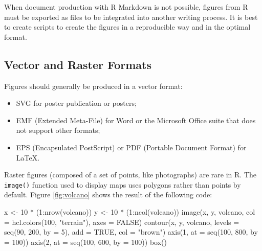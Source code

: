 \documentclass[
  12pt,
  american,
  a4paper,
  extrafontsizes,onecolumn,openright
  ]{memoir}
\newenvironment{Shaded}{\begin{snugshade}}{\end{snugshade}}
\newcommand{\AttributeTok}[1]{\textcolor[rgb]{0.77,0.63,0.00}{#1}}
\newcommand{\ConstantTok}[1]{\textcolor[rgb]{0.00,0.00,0.00}{#1}}
\newcommand{\DecValTok}[1]{\textcolor[rgb]{0.00,0.00,0.81}{#1}}
\newcommand{\FunctionTok}[1]{\textcolor[rgb]{0.00,0.00,0.00}{#1}}
\newcommand{\NormalTok}[1]{#1}
\newcommand{\OtherTok}[1]{\textcolor[rgb]{0.56,0.35,0.01}{#1}}
\newcommand{\SpecialCharTok}[1]{\textcolor[rgb]{0.00,0.00,0.00}{#1}}
\newcommand{\StringTok}[1]{\textcolor[rgb]{0.31,0.60,0.02}{#1}}
\providecommand{\tightlist}{%
  \setlength{\itemsep}{0pt}\setlength{\parskip}{0pt}}
\begin{document}
When document production with R Markdown is not possible, figures from R must be exported as files to be integrated into another writing process.
It is best to create scripts to create the figures in a reproducible way and in the optimal format.

\hypertarget{vector-and-raster-formats}{%
\subsection{Vector and Raster Formats}\label{vector-and-raster-formats}}

Figures should generally be produced in a vector format:

\begin{itemize}
\tightlist
\item
  SVG for poster publication or posters;
\item
  EMF (Extended Meta-File) for Word or the Microsoft Office suite that does not support other formats;
\item
  EPS (Encapsulated PostScript) or PDF (Portable Document Format) for LaTeX.
\end{itemize}

Raster figures (composed of a set of points, like photographs) are rare in R.
The \texttt{image()} function used to display maps uses polygons rather than points by default.
Figure \ref{fig:volcano} shows the result of the following code:



\scriptsize

\begin{Shaded}
\begin{Highlighting}[]
\NormalTok{x }\OtherTok{\textless{}{-}} \DecValTok{10} \SpecialCharTok{*}\NormalTok{ (}\DecValTok{1}\SpecialCharTok{:}\FunctionTok{nrow}\NormalTok{(volcano))}
\NormalTok{y }\OtherTok{\textless{}{-}} \DecValTok{10} \SpecialCharTok{*}\NormalTok{ (}\DecValTok{1}\SpecialCharTok{:}\FunctionTok{ncol}\NormalTok{(volcano))}
\FunctionTok{image}\NormalTok{(x, y, volcano, }\AttributeTok{col =} \FunctionTok{hcl.colors}\NormalTok{(}\DecValTok{100}\NormalTok{, }\StringTok{"terrain"}\NormalTok{), }\AttributeTok{axes =} \ConstantTok{FALSE}\NormalTok{)}
\FunctionTok{contour}\NormalTok{(x, y, volcano, }\AttributeTok{levels =} \FunctionTok{seq}\NormalTok{(}\DecValTok{90}\NormalTok{, }\DecValTok{200}\NormalTok{, }\AttributeTok{by =} \DecValTok{5}\NormalTok{), }\AttributeTok{add =} \ConstantTok{TRUE}\NormalTok{,}
    \AttributeTok{col =} \StringTok{"brown"}\NormalTok{)}
\FunctionTok{axis}\NormalTok{(}\DecValTok{1}\NormalTok{, }\AttributeTok{at =} \FunctionTok{seq}\NormalTok{(}\DecValTok{100}\NormalTok{, }\DecValTok{800}\NormalTok{, }\AttributeTok{by =} \DecValTok{100}\NormalTok{))}
\FunctionTok{axis}\NormalTok{(}\DecValTok{2}\NormalTok{, }\AttributeTok{at =} \FunctionTok{seq}\NormalTok{(}\DecValTok{100}\NormalTok{, }\DecValTok{600}\NormalTok{, }\AttributeTok{by =} \DecValTok{100}\NormalTok{))}
\FunctionTok{box}\NormalTok{()}
\end{Highlighting}
\end{Shaded}
\end{document}
